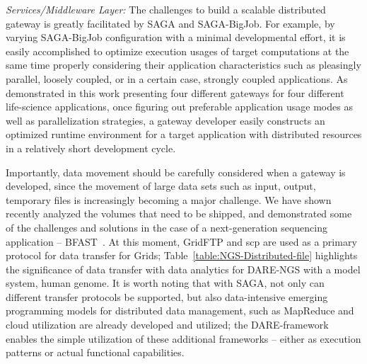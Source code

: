 \documentclass{sig-alternate}
\begin{document}
\textit{Services/Middleware Layer:} The challenges to build a scalable
distributed gateway is greatly facilitated by SAGA and SAGA-BigJob.
For example, by varying SAGA-BigJob configuration with a minimal
developmental effort, it is easily accomplished to optimize execution
usages of target computations at the same time properly considering
their application characteristics such as pleasingly parallel, loosely
coupled, or in a certain case, strongly coupled applications.  As
demonstrated in this work presenting four different gateways for four
different life-science applications, once figuring out preferable
application usage modes as well as parallelization strategies, a
gateway developer easily constructs an optimized runtime environment
for a target application with distributed resources in a relatively
short development cycle.


Importantly, data movement should be carefully considered when a
gateway is developed, since the movement of large data sets such as
input, output, temporary files is increasingly becoming a major
challenge. We have shown recently analyzed the volumes that need to be
shipped, and demonstrated some of the challenges and solutions in the
case of a next-generation sequencing application --
BFAST~\cite{ecmls11}. At this moment, GridFTP and scp are used as a
primary protocol for data transfer for Grids;
Table~\ref{table:NGS-Distributed-file} highlights the significance of
data transfer with data analytics for DARE-NGS with a model system,
human genome.  It is worth noting that with SAGA, not only can
different transfer protocols be supported, but also data-intensive
emerging programming models for distributed data management, such as
MapReduce and cloud utilization are already developed and
utilized\cite{abstractions-azure,saga-ccgrid10}; the DARE-framework
enables the simple utilization of these additional frameworks --
either as execution patterns or actual functional capabilities.

%
\end{document}
